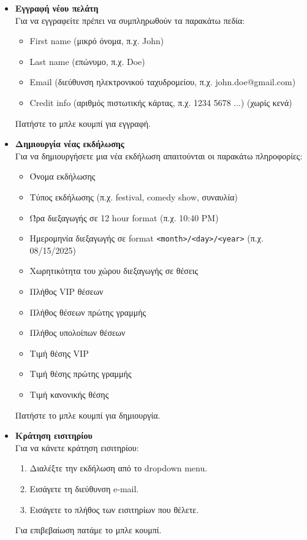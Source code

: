 \documentclass[a4paper, 11pt]{article}
\begin{document}
\begin{itemize}
    \item \textbf{Εγγραφή νέου πελάτη}\\
    Για να εγγραφείτε πρέπει να συμπληρωθούν τα παρακάτω πεδία:
    \begin{itemize}
        \item First name (μικρό όνομα, π.χ. John)
        \item Last name (επώνυμο, π.χ. Doe)
        \item Email (διεύθυνση ηλεκτρονικού ταχυδρομείου, π.χ. john.doe@gmail.com)
        \item Credit info (αριθμός πιστωτικής κάρτας, π.χ. 1234 5678 ...) (χωρίς κενά)
    \end{itemize}
    Πατήστε το μπλε κουμπί για εγγραφή.

    \item \textbf{Δημιουργία νέας εκδήλωσης}\\
    Για να δημιουργήσετε μια νέα εκδήλωση απαιτούνται οι παρακάτω πληροφορίες:
    \begin{itemize}
        \item Όνομα εκδήλωσης
        \item Τύπος εκδήλωσης (π.χ. festival, comedy show, συναυλία)
        \item Ώρα διεξαγωγής σε 12 hour format (π.χ. 10:40 PM)
        \item Ημερομηνία διεξαγωγής σε format \texttt{<month>/<day>/<year>} (π.χ. 08/15/2025)
        \item Χωρητικότητα του χώρου διεξαγωγής σε θέσεις
        \item Πλήθος VIP θέσεων
        \item Πλήθος θέσεων πρώτης γραμμής
        \item Πλήθος υπολοίπων θέσεων
        \item Τιμή θέσης VIP
        \item Τιμή θέσης πρώτης γραμμής
        \item Τιμή κανονικής θέσης
    \end{itemize}
    Πατήστε το μπλε κουμπί για δημιουργία.

    \item \textbf{Κράτηση εισιτηρίου}\\
    Για να κάνετε κράτηση εισιτηρίου:
    \begin{enumerate}
        \item Διαλέξτε την εκδήλωση από το dropdown menu.
        \item Εισάγετε τη διεύθυνση e-mail.
        \item Εισάγετε το πλήθος των εισιτηρίων που θέλετε.
    \end{enumerate}
    Για επιβεβαίωση πατάμε το μπλε κουμπί.


\end{itemize}
\end{document}
